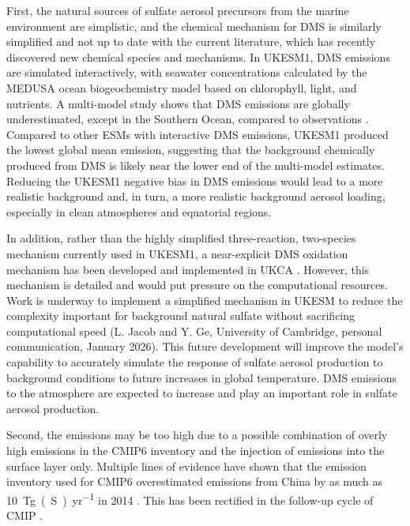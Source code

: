 First, the natural sources of sulfate aerosol precursors from the marine environment are simplistic, and the chemical mechanism for DMS is similarly simplified and not up to date with the current literature, which has recently discovered new chemical species and mechanisms. In UKESM1, DMS emissions are simulated interactively, with seawater concentrations calculated by the MEDUSA ocean biogeochemistry model based on chlorophyll, light, and nutrients. A multi-model study shows that DMS emissions are globally underestimated, except in the Southern Ocean, compared to observations \citep[][]{bockEvaluationOceanDimethylsulfide2021}. Compared to other ESMs with interactive DMS emissions, UKESM1 produced the lowest global mean emission, suggesting that the background  chemically produced from DMS is likely near the lower end of the multi-model estimates. Reducing the UKESM1 negative bias in DMS emissions would lead to a more realistic background  and, in turn, a more realistic background aerosol loading, especially in clean atmospheres and equatorial regions. 

In addition, rather than the highly simplified three-reaction, two-species mechanism currently used in UKESM1, a near-explicit DMS oxidation mechanism has been developed and implemented in UKCA \citep[][]{calaDevelopmentIntercomparisonEvaluation2023}. However, this mechanism is detailed and would put pressure on the computational resources. Work is underway to implement a simplified mechanism in UKESM to reduce the complexity important for background natural sulfate without sacrificing computational speed (L. Jacob and Y. Ge, University of Cambridge, personal communication, January 2026). This future development will improve the model's capability to accurately simulate the response of sulfate aerosol production to background conditions to future increases in global temperature. DMS emissions to the atmosphere are expected to increase and play an important role in sulfate aerosol production. 

Second, the  emissions may be too high due to a possible combination of overly high emissions in the CMIP6 inventory and the injection of emissions into the surface layer only. Multiple lines of evidence have shown that the emission inventory used for CMIP6 overestimated  emissions from China by as much as \qty{10}{Tg(S)~yr^{-1}} in 2014 \citep[][]{fanComparisonAnthropogenicEmission2022}. This has been rectified in the follow-up cycle of CMIP \citep[][]{durackEarthSystemForcing2025}. 

